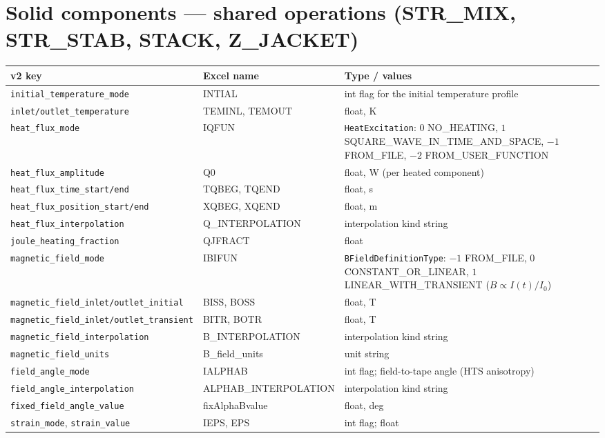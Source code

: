\documentclass[10pt,a4paper]{article}
\newcommand{\code}[1]{\texttt{#1}}
\begin{document}
\section*{Solid components --- shared operations (STR\_MIX, STR\_STAB, STACK, Z\_JACKET)}

\begin{longtable}{p{5.6cm}p{3.4cm}p{6.2cm}}
\toprule
\textbf{v2 key} & \textbf{Excel name} & \textbf{Type / values} \\
\midrule
\endhead
\code{initial\_temperature\_mode} & INTIAL & int flag for the initial temperature profile \\
\code{inlet/outlet\_temperature} & TEMINL, TEMOUT & float, K \\
\code{heat\_flux\_mode} & IQFUN & \code{HeatExcitation}: $0$ NO\_HEATING, $1$ SQUARE\_WAVE\_IN\_TIME\_AND\_SPACE, $-1$ FROM\_FILE, $-2$ FROM\_USER\_FUNCTION \\
\code{heat\_flux\_amplitude} & Q0 & float, W (per heated component) \\
\code{heat\_flux\_time\_start/end} & TQBEG, TQEND & float, s \\
\code{heat\_flux\_position\_start/end} & XQBEG, XQEND & float, m \\
\code{heat\_flux\_interpolation} & Q\_INTERPOLATION & interpolation kind string \\
\code{joule\_heating\_fraction} & QJFRACT & float \\
\code{magnetic\_field\_mode} & IBIFUN & \code{BFieldDefinitionType}: $-1$ FROM\_FILE, $0$ CONSTANT\_OR\_LINEAR, $1$ LINEAR\_WITH\_TRANSIENT ($B \propto I(t)/I_0$) \\
\code{magnetic\_field\_inlet/outlet\_initial} & BISS, BOSS & float, T \\
\code{magnetic\_field\_inlet/outlet\_transient} & BITR, BOTR & float, T \\
\code{magnetic\_field\_interpolation} & B\_INTERPOLATION & interpolation kind string \\
\code{magnetic\_field\_units} & B\_field\_units & unit string \\
\code{field\_angle\_mode} & IALPHAB & int flag; field-to-tape angle (HTS anisotropy) \\
\code{field\_angle\_interpolation} & ALPHAB\_INTERPOLATION & interpolation kind string \\
\code{fixed\_field\_angle\_value} & fixAlphaBvalue & float, deg \\
\code{strain\_mode}, \code{strain\_value} & IEPS, EPS & int flag; float \\

\end{longtable}
\end{document}
